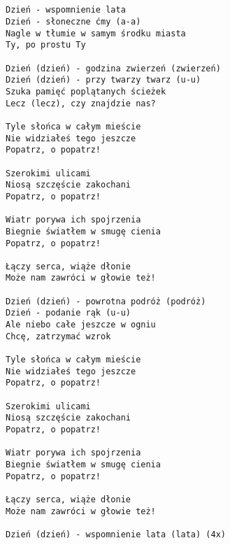 \documentclass[12pt]{article}
\begin{document}
\subsection*{}
\begin{verbatim}
Dzień - wspomnienie lata
Dzień - słoneczne ćmy (a-a)
Nagle w tłumie w samym środku miasta
Ty, po prostu Ty

Dzień (dzień) - godzina zwierzeń (zwierzeń)
Dzień (dzień) - przy twarzy twarz (u-u)
Szuka pamięć poplątanych ścieżek
Lecz (lecz), czy znajdzie nas?

Tyle słońca w całym mieście
Nie widziałeś tego jeszcze
Popatrz, o popatrz!

Szerokimi ulicami
Niosą szczęście zakochani
Popatrz, o popatrz!

Wiatr porywa ich spojrzenia
Biegnie światłem w smugę cienia
Popatrz, o popatrz!

Łączy serca, wiąże dłonie
Może nam zawróci w głowie też!

Dzień (dzień) - powrotna podróż (podróż)
Dzień - podanie rąk (u-u)
Ale niebo całe jeszcze w ogniu
Chcę, zatrzymać wzrok

Tyle słońca w całym mieście
Nie widziałeś tego jeszcze
Popatrz, o popatrz!

Szerokimi ulicami
Niosą szczęście zakochani
Popatrz, o popatrz!

Wiatr porywa ich spojrzenia
Biegnie światłem w smugę cienia
Popatrz, o popatrz!

Łączy serca, wiąże dłonie
Może nam zawróci w głowie też!

Dzień (dzień) - wspomnienie lata (lata) (4x)
\end{verbatim}
\clearpage
\end{document}
